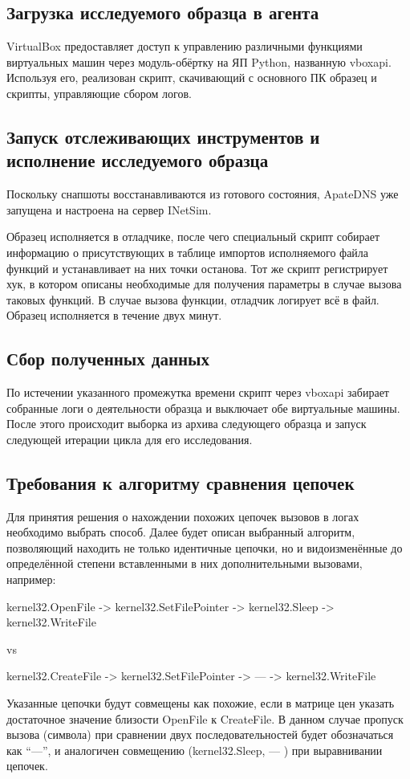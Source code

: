 \subsection {Загрузка исследуемого образца в агента}
VirtualBox предоставляет доступ к управлению различными функциями виртуальных машин через модуль-обёртку на ЯП Python, названную vboxapi. Используя его, реализован скрипт, скачивающий с основного ПК образец и скрипты, управляющие сбором логов.
\subsection {Запуск отслеживающих инструментов и исполнение исследуемого образца}
Поскольку снапшоты восстанавливаются из готового состояния, ApateDNS уже запущена и настроена на сервер INetSim.

Образец исполняется в отладчике, после чего специальный скрипт собирает информацию о присутствующих в таблице импортов исполняемого файла функций и устанавливает на них точки останова. Тот же скрипт регистрирует хук, в котором описаны необходимые для получения параметры в случае вызова таковых функций.
В случае вызова функции, отладчик логирует всё в файл. Образец исполняется в течение двух минут.
\subsection {Сбор полученных данных}
По истечении указанного промежутка времени скрипт через vboxapi забирает собранные логи о деятельности образца и выключает обе виртуальные машины. После этого происходит выборка из архива следующего образца и запуск следующей итерации цикла для его исследования.

\subsection {Требования к алгоритму сравнения цепочек}
 Для принятия решения о нахождении похожих цепочек вызовов в логах необходимо выбрать способ. Далее будет описан выбранный алгоритм, позволяющий находить не только идентичные цепочки, но и видоизменённые до определённой степени вставленными в них дополнительными вызовами, например:

kernel32.OpenFile -> kernel32.SetFilePointer -> kernel32.Sleep -> kernel32.WriteFile

vs

kernel32.CreateFile -> kernel32.SetFilePointer -> ---  ->   kernel32.WriteFile

Указанные цепочки будут совмещены как похожие, если в матрице цен указать достаточное значение близости OpenFile к CreateFile.
В данном случае пропуск  вызова (символа) при сравнении двух последовательностей будет обозначаться как ``---'', и аналогичен совмещению (kernel32.Sleep, --- ) при выравнивании цепочек.
